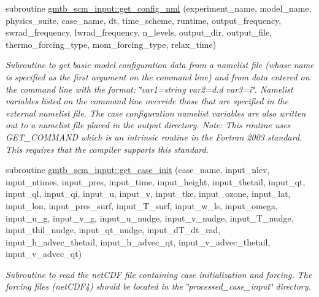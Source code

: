 \begin{DoxyCompactItemize}
\item 
subroutine \hyperlink{group__input_ga53e9e5313d4dfa2d2f917d212f92f636}{gmtb\+\_\+scm\+\_\+input\+::get\+\_\+config\+\_\+nml} (experiment\+\_\+name, model\+\_\+name, physics\+\_\+suite, case\+\_\+name, dt, time\+\_\+scheme, runtime, output\+\_\+frequency,   swrad\+\_\+frequency, lwrad\+\_\+frequency, n\+\_\+levels, output\+\_\+dir, output\+\_\+file, thermo\+\_\+forcing\+\_\+type, mom\+\_\+forcing\+\_\+type, relax\+\_\+time)
\begin{DoxyCompactList}\small\item\em Subroutine to get basic model configuration data from a namelist file (whose name is specified as the first argument on the command line) and from data entered on the command line with the format\+: \char`\"{}var1=\textquotesingle{}string\textquotesingle{} var2=d.\+d var3=i\char`\"{}. Namelist variables listed on the command line override those that are specified in the external namelist file. The case configuration namelist variables are also written out to a namelist file placed in the output directory. Note\+: This routine uses G\+E\+T\+\_\+\+C\+O\+M\+M\+A\+ND which is an intrinsic routine in the Fortran 2003 standard. This requires that the compiler supports this standard. \end{DoxyCompactList}\end{DoxyCompactItemize}
\begin{DoxyCompactItemize}
\item 
subroutine \hyperlink{group__input_ga0941c411598781019aef6c3a047a040c}{gmtb\+\_\+scm\+\_\+input\+::get\+\_\+case\+\_\+init} (case\+\_\+name, input\+\_\+nlev, input\+\_\+ntimes, input\+\_\+pres, input\+\_\+time, input\+\_\+height, input\+\_\+thetail,   input\+\_\+qt, input\+\_\+ql, input\+\_\+qi, input\+\_\+u, input\+\_\+v, input\+\_\+tke, input\+\_\+ozone, input\+\_\+lat, input\+\_\+lon, input\+\_\+pres\+\_\+surf, input\+\_\+\+T\+\_\+surf,   input\+\_\+w\+\_\+ls, input\+\_\+omega, input\+\_\+u\+\_\+g, input\+\_\+v\+\_\+g, input\+\_\+u\+\_\+nudge, input\+\_\+v\+\_\+nudge, input\+\_\+\+T\+\_\+nudge, input\+\_\+thil\+\_\+nudge, input\+\_\+qt\+\_\+nudge,   input\+\_\+d\+T\+\_\+dt\+\_\+rad, input\+\_\+h\+\_\+advec\+\_\+thetail, input\+\_\+h\+\_\+advec\+\_\+qt, input\+\_\+v\+\_\+advec\+\_\+thetail, input\+\_\+v\+\_\+advec\+\_\+qt)
\begin{DoxyCompactList}\small\item\em Subroutine to read the net\+C\+DF file containing case initialization and forcing. The forcing files (net\+C\+D\+F4) should be located in the \char`\"{}processed\+\_\+case\+\_\+input\char`\"{} directory. \end{DoxyCompactList}\end{DoxyCompactItemize}


